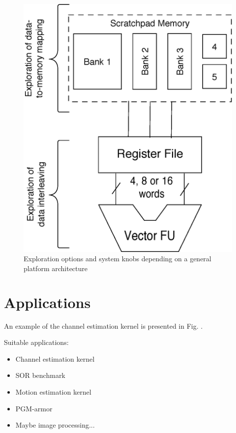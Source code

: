 \documentclass[prodmode,acmtodaes]{acmsmall}
\begin{document}
\begin{figure}
\centering
	\label{arch}
	\caption{Exploration options and system knobs depending on a general platform architecture}
	\includegraphics[scale = 0.5]{Images/Architecture.eps} 
\end{figure}

\section{Applications}

An example of the channel estimation kernel is presented in Fig. .

Suitable applications:
\begin{itemize}
\item Channel estimation kernel
\item SOR benchmark
\item Motion estimation kernel
\item PGM-armor
\item Maybe image processing...
\end{itemize}
\end{document}
